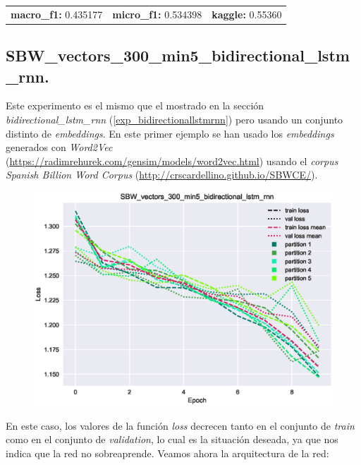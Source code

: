 \documentclass[11pt]{article}
\begin{document}
\begin{table}[H]
\begin{tabular}{c|c|c}
\textbf{macro\_f1:} 0.435177 & \textbf{micro\_f1:} 0.534398 & \textbf{kaggle:} 0.55360
\end{tabular}
\end{table}

\subsection{SBW\_vectors\_300\_min5\_bidirectional\_lstm\_rnn.} \label{exp_SBWvectors300min5bidirectionallstmrnn}

Este experimento es el mismo que el mostrado en la sección \textit{bidirectional\_lstm\_rnn} (\ref{exp_bidirectionallstmrnn}) pero usando un conjunto distinto de \textit{embeddings}. En este primer ejemplo se han usado los \textit{embeddings} generados con \textit{Word2Vec} (\href{https://radimrehurek.com/gensim/models/word2vec.html}{https://radimrehurek.com/gensim/models/word2vec.html}) usando el \textit{corpus} \textit{Spanish Billion Word Corpus} (\href{http://crscardellino.github.io/SBWCE/}{http://crscardellino.github.io/SBWCE/}).

\begin{figure}[H]
\includegraphics[width=\linewidth]{images/loss/SBW_vectors_300_min5_bidirectional_lstm_rnn-1554402884.eps}
\end{figure}

En este caso, los valores de la función \textit{loss} decrecen tanto en el conjunto de \textit{train} como en el conjunto de \textit{validation}, lo cual es la situación deseada, ya que nos indica que la red no sobreaprende. Veamos ahora la arquitectura de la red:
\end{document}
